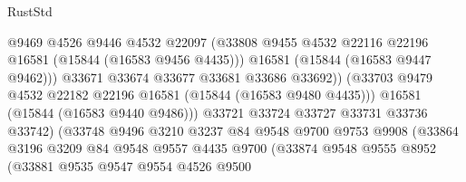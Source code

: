 \begin{lexlean}{RustStd}
\begin{coremodule}
                                      @9469
                                      @4526
                                      @9446
                                      @4532
                                      @22097
                                      (@33808
                                        @9455
                                        @4532
                                        @22116
                                        @22196
                                        @16581
                                        (@15844 (@16583 @9456 @4435)))
                                      @16581
                                      (@15844 (@16583 @9447 @9462)))
                                    @33671
                                    @33674
                                    @33677
                                    @33681
                                    @33686
                                    @33692))
                                (@33703
                                  @9479
                                  @4532
                                  @22182
                                  @22196
                                  @16581
                                  (@15844 (@16583 @9480 @4435)))
                                @16581
                                (@15844 (@16583 @9440 @9486)))
                              @33721
                              @33724
                              @33727
                              @33731
                              @33736
                              @33742)
                            (@33748
                              @9496
                              @3210
                              @3237
                              @84
                              @9548
                              @9700
                              @9753
                              @9908
                              (@33864
                                @3196
                                @3209
                                @84
                                @9548
                                @9557
                                @4435
                                @9700
                                (@33874
                                  @9548
                                  @9555
                                  @8952
                                  (@33881
                                    @9535
                                    @9547
                                    @9554
                                    @4526
                                    @9500

\end{coremodule}
\end{lexlean}
